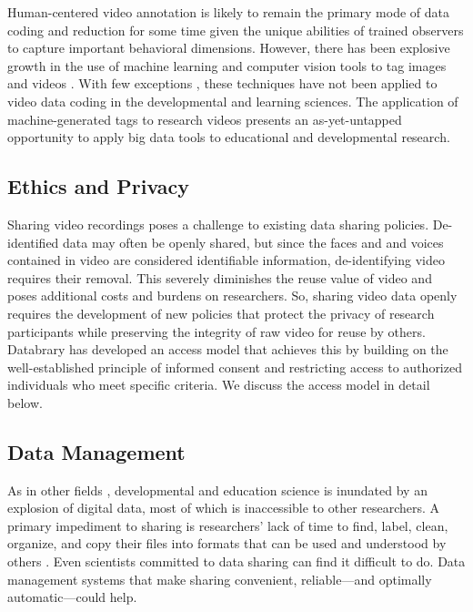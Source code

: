 \documentclass[letterpaper,man,apacite]{apa6}
\begin{document}
Human-centered video annotation is likely to remain the primary mode of data coding and reduction for some time given the unique abilities of trained observers to capture important behavioral dimensions.
However, there has been explosive growth in the use of machine learning and computer vision tools to tag images and videos \cite{Google2014}
. 
With few exceptions \cite{ChenYu2013,Raudies2014,Fathi2012}, 
these techniques have not been applied to video data coding in the developmental and learning sciences. 
The application of machine-generated tags to research videos presents an as-yet-untapped opportunity to apply big data tools to educational and developmental research.

\subsection{Ethics and Privacy}

Sharing video recordings poses a challenge to existing data sharing policies.
De-identified data \cite{HHS} 
may often be openly shared, but since the faces and and voices contained in video are considered identifiable information, de-identifying video requires their removal.
This severely diminishes the reuse value of video and poses additional costs and burdens on researchers.
So, sharing video data openly requires the development of new policies that protect the privacy of research participants while preserving the integrity of raw video for reuse by others.
Databrary has developed an access model that achieves this by building on the well-established principle of informed consent and restricting access to authorized individuals who meet specific criteria.
We discuss the access model in detail below.

\subsection{Data Management}

As in other fields \cite{Overpeck2011}, developmental and education science is inundated by an explosion of digital data, most of which is inaccessible to other researchers.
A primary impediment to sharing is researchers’ lack of time to find, label, clean, organize, and copy their files into formats that can be used and understood by others \cite{Ascoli2006}. 
Even scientists committed to data sharing can find it difficult to do. 
Data management systems that make sharing convenient, reliable—and optimally automatic—could help.
\end{document}
